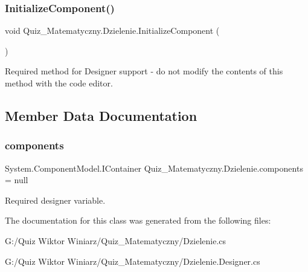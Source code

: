 \subsubsection{\texorpdfstring{InitializeComponent()}{InitializeComponent()}}
{\footnotesize\ttfamily void Quiz\+\_\+\+Matematyczny.\+Dzielenie.\+Initialize\+Component (\begin{DoxyParamCaption}{ }\end{DoxyParamCaption})\hspace{0.3cm}{\ttfamily [private]}}



Required method for Designer support -\/ do not modify the contents of this method with the code editor. 



\subsection{Member Data Documentation}
\mbox{\label{class_quiz___matematyczny_1_1_dzielenie_a3cc142e70c350e27207c361550253a70}} 
\subsubsection{\texorpdfstring{components}{components}}
{\footnotesize\ttfamily System.\+Component\+Model.\+I\+Container Quiz\+\_\+\+Matematyczny.\+Dzielenie.\+components = null\hspace{0.3cm}{\ttfamily [private]}}



Required designer variable. 



The documentation for this class was generated from the following files\+:\begin{DoxyCompactItemize}
\item 
G\+:/\+Quiz Wiktor Winiarz/\+Quiz\+\_\+\+Matematyczny/Dzielenie.\+cs\item 
G\+:/\+Quiz Wiktor Winiarz/\+Quiz\+\_\+\+Matematyczny/Dzielenie.\+Designer.\+cs\end{DoxyCompactItemize}

